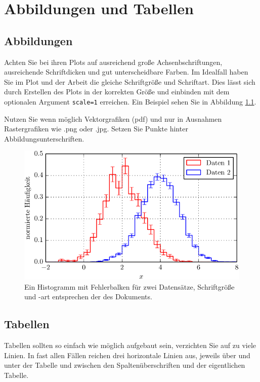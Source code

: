 \chapter{Abbildungen und Tabellen}

\section{Abbildungen}

Achten Sie bei ihren Plots auf ausreichend große Achsenbschriftungen, ausreichende Schriftdicken und gut unterscheidbare Farben.
Im Idealfall haben Sie im Plot und der Arbeit die gleiche Schriftgröße und Schriftart.
Dies lässt sich durch Erstellen des Plots in der korrekten Größe und einbinden mit dem optionalen Argument \texttt{scale=1} erreichen. Ein Beispiel sehen Sie in Abbildung \ref{fig:bsp}.

Nutzen Sie wenn möglich Vektorgrafiken (pdf) und nur in Ausnahmen Rastergrafiken wie .png oder .jpg.
Setzen Sie Punkte hinter Abbildungsunterschriften.

\begin{figure}
    \centering
    \includegraphics[scale=1]{./Plots/Histogramm.pdf}
    \caption{Ein Histogramm mit Fehlerbalken für zwei Datensätze, Schriftgröße und -art entsprechen der des Dokuments.}
    \label{fig:bsp}
\end{figure}

\section{Tabellen}

Tabellen sollten so einfach wie möglich aufgebaut sein, verzichten Sie auf zu viele Linien. In fast allen Fällen reichen drei horizontale Linien aus, jeweils über und unter der Tabelle und zwischen den Spaltenüberschriften und der eigentlichen Tabelle.

